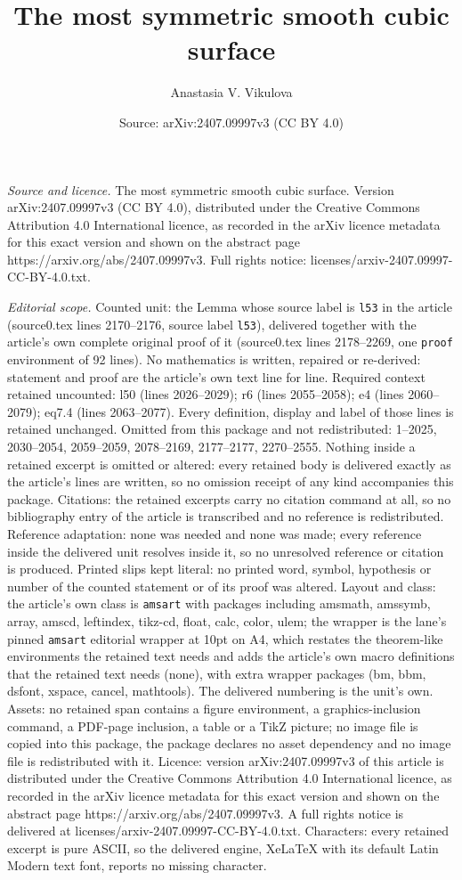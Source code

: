 \documentclass[10pt,a4paper]{amsart}
\title[The most symmetric smooth cubic surface]{The most symmetric smooth cubic surface}
\author{Anastasia V. Vikulova}
\date{Source: arXiv:2407.09997v3 (CC BY 4.0)}
\begin{document}
\maketitle

\noindent\emph{Source and licence.} The most symmetric smooth cubic surface. Version arXiv:2407.09997v3 (CC BY 4.0), distributed under the Creative Commons Attribution 4.0 International licence, as recorded in the arXiv licence metadata for this exact version and shown on the abstract page https://arxiv.org/abs/2407.09997v3. Full rights notice: licenses/arxiv-2407.09997-CC-BY-4.0.txt.\par\smallskip

\noindent\textit{Editorial scope.} Counted unit: the Lemma whose source label is \texttt{l53} in the article (source0.tex lines 2170--2176, source label \texttt{l53}), delivered together with the article's own complete original proof of it (source0.tex lines 2178--2269, one \texttt{proof} environment of 92 lines). No mathematics is written, repaired or re-derived: statement and proof are the article's own text line for line. Required context retained uncounted: l50 (lines 2026--2029); r6 (lines 2055--2058); e4 (lines 2060--2079); eq7.4 (lines 2063--2077). Every definition, display and label of those lines is retained unchanged. Omitted from this package and not redistributed: 1--2025, 2030--2054, 2059--2059, 2078--2169, 2177--2177, 2270--2555. Nothing inside a retained excerpt is omitted or altered: every retained body is delivered exactly as the article's lines are written, so no omission receipt of any kind accompanies this package. Citations: the retained excerpts carry no citation command at all, so no bibliography entry of the article is transcribed and no reference is redistributed. Reference adaptation: none was needed and none was made; every reference inside the delivered unit resolves inside it, so no unresolved reference or citation is produced. Printed slips kept literal: no printed word, symbol, hypothesis or number of the counted statement or of its proof was altered. Layout and class: the article's own class is \texttt{amsart} with packages including amsmath, amssymb, array, amscd, leftindex, tikz-cd, float, calc, color, ulem; the wrapper is the lane's pinned \texttt{amsart} editorial wrapper at 10pt on A4, which restates the theorem-like environments the retained text needs and adds the article's own macro definitions that the retained text needs (none), with extra wrapper packages (bm, bbm, dsfont, xspace, cancel, mathtools). The delivered numbering is the unit's own. Assets: no retained span contains a figure environment, a graphics-inclusion command, a PDF-page inclusion, a table or a TikZ picture; no image file is copied into this package, the package declares no asset dependency and no image file is redistributed with it. Licence: version arXiv:2407.09997v3 of this article is distributed under the Creative Commons Attribution 4.0 International licence, as recorded in the arXiv licence metadata for this exact version and shown on the abstract page https://arxiv.org/abs/2407.09997v3. A full rights notice is delivered at licenses/arxiv-2407.09997-CC-BY-4.0.txt. Characters: every retained excerpt is pure ASCII, so the delivered engine, XeLaTeX with its default Latin Modern text font, reports no missing character.
\end{document}

